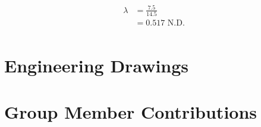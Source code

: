 \begin{enumerate}[wide,label=\textbf{\arabic*}., labelindent=0pt]
        \begin{align*}
            \lambda &= \frac{7.5}{14.5}\\
            &= 0.517 \text{ N.D.}\\
        \end{align*}    
 
\section{Engineering Drawings} \label{apx:eng_drawings}
    
    
    
    
    
    
    
    
    
    
    


\section{Group Member Contributions} \label{apx:contributions}


\end{enumerate}
